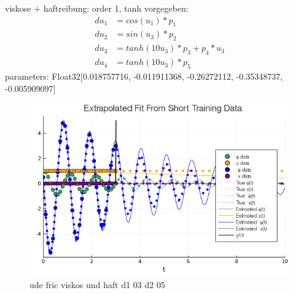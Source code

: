 \documentclass[arbeit=studie,oneside,BCOR=12mm]{ArbeitRST}
\begin{document}
viskose + haftreibung: order 1, tanh vorgegeben:\\
\begin{align*}
du_1 &= cos(u_1) * p_1\\
du_2 &= sin(u_3) * p_2\\
du_3 &= tanh(10u_3) * p_3 + p_4 * u_3\\
du_4 &= tanh(10u_3) * p_5
\end{align*}
parameters: Float32[0.018757716, -0.011911368, -0.26272112, -0.35348737, -0.005909097]

\begin{figure}
\includegraphics[width=1\textwidth]{images/ude_fric_viskos_d1_03_d2_05}
\caption{ude fric viskos und haft d1 03 d2 05}
\end{figure}
\end{document}
